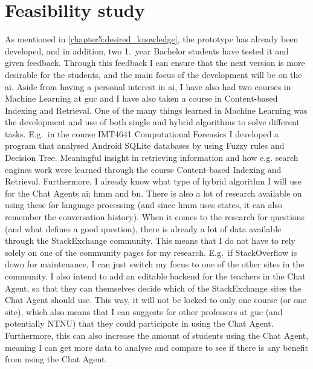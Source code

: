 \chapter{Feasibility study}
\label{chapter6:feasibility_study}
As mentioned in \ref{chapter5:desired_knowledge}, the prototype has already been developed, and in addition, two 1.~year Bachelor students have tested it and given feedback. 
Through this feedback I can ensure that the next version is more desirable for the students, and the main focus of the development will be on the \gls{ai}. Aside from 
having a personal interest in \gls{ai}, I have also had two courses in Machine Learning at \gls{guc} and I have also taken a course in Content-based Indexing and Retrieval. 
One of the many things learned in Machine Learning was the development and use of both single and hybrid algorithms to solve different tasks. E.g.~in the course IMT4641 
Computational Forensics I developed a program that analysed Android SQLite databases by using Fuzzy rules and Decision Tree. Meaningful insight in retrieving information 
and how e.g. search engines work were learned through the course Content-based Indexing and Retrieval. Furthermore, I already know what type of hybrid algorithm I will use 
for the Chat Agents \gls{ai}; \gls{hmm} and \gls{bn}. There is also a lot of research available on using these for language processing (and since \gls{hmm} uses states, it 
can also remember the conversation history).
\vspace{0.5em}\newline
When it comes to the research for questions (and what defines a good question), there is already a lot of data available through the StackExchange community. This means that 
I do not have to rely solely on one of the community pages for my research. E.g.~if StackOverflow is down for maintenance, I can just switch my focus to one of the other 
sites in the community. I also intend to add an editable backend for the teachers in the Chat Agent, so that they can themselves decide which of the StackExchange sites the 
Chat Agent should use. This way, it will not be locked to only one course (or one site), which also means that I can suggests for other professors at \gls{guc} (and potentially 
NTNU) that they could participate in using the Chat Agent. Furthermore, this can also increase the amount of students using the Chat Agent, meaning I can get more data to 
analyse and compare to see if there is any benefit from using the Chat Agent.

